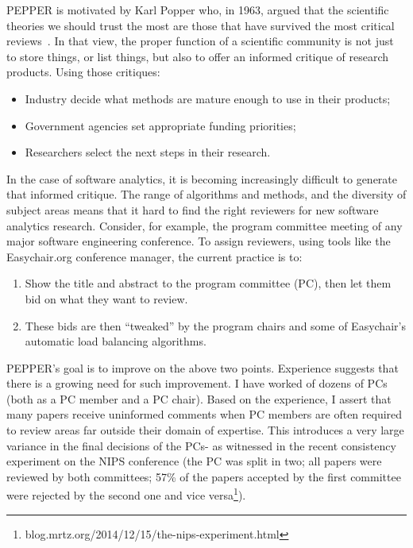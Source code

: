 \documentclass[journal]{IEEEtran}
\newcommand{\bi}{\begin{itemize}}
\newcommand{\ei}{\end{itemize}}
\newcommand{\be}{\begin{enumerate}}
\newcommand{\ee}{\end{enumerate}}
\begin{document}
PEPPER is motivated by Karl Popper who, in 1963, 
argued that the scientific theories
we should trust the most are those that have survived the most critical
reviews~\cite{popper63}. In that view, the proper function of a scientific
community
is  not just to store things, or list things, but also
to offer an informed critique of research products.  
Using those critiques:
\bi
\item  Industry  decide what methods are mature enough to use in their products;
\item Government agencies  set appropriate  funding priorities;
\item  Researchers  select  the next steps in their research.
\ei
In the case of software analytics, it is becoming increasingly difficult
to generate that informed critique. The range of algorithms and methods,
and the diversity of subject areas means that it hard to find the right
reviewers for new software analytics research.  Consider, for example, 
the program committee meeting of any major software
engineering conference. To assign reviewers, using tools
like the Easychair.org conference manager, the current practice is to:
\be
\item
Show the title and abstract to the program committee (PC), then let them bid on what they want to review. 
\item
These bids are then ``tweaked'' by the program chairs
and some of Easychair's automatic load balancing algorithms.
\ee
PEPPER's goal is to improve on the above two points.
Experience suggests that there is a growing need for such improvement.
I have worked of dozens of PCs
(both as a PC member and a PC chair). Based on the experience, I assert that many papers
receive uninformed
comments when PC members are often required
to review areas far outside their domain of expertise.
This introduces a very large variance in the final decisions of the PCs- as witnessed in the  recent  
consistency experiment on the NIPS conference (the PC was split in two; all papers were reviewed by both committees; 57\% of the papers accepted by the first committee were rejected by the second one and vice versa\footnote{blog.mrtz.org/2014/12/15/the-nips-experiment.html}).
\end{document}
